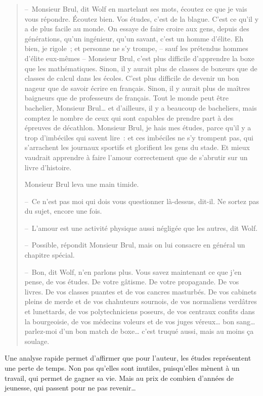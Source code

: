 {\small
\begin{quotation}
– Monsieur Brul, dit Wolf en martelant ses mots, écoutez ce que je vais vous répondre.
Écoutez bien. Vos études, c’est de la blague. C’est ce qu’il y a de plus facile au monde.
On essaye de faire croire aux gens, depuis des générations, qu’un ingénieur, qu’un savant,
c’est un homme d’élite. Eh bien, je rigole ; et personne ne s’y trompe, – sauf les
prétendus hommes d’élite eux-mêmes – Monsieur Brul, c’est plus difficile d’apprendre la
boxe que les mathématiques. Sinon, il y aurait plus de classes de boxeurs que de classes
de calcul dans les écoles. C’est plus difficile de devenir un bon nageur que de savoir
écrire en français. Sinon, il y aurait plus de maîtres baigneurs que de professeurs de
français. Tout le monde peut être bachelier, Monsieur Brul… et d’ailleurs, il y a beaucoup
de bacheliers, mais comptez le nombre de ceux qui sont capables de prendre part à des
épreuves de décathlon. Monsieur Brul, je hais mes études, parce qu’il y a trop
d’imbéciles qui savent lire : et ces imbéciles ne s’y trompent pas, qui s’arrachent
les journaux sportifs et glorifient les gens du stade. Et mieux vaudrait apprendre à
faire l’amour correctement que de s’abrutir sur un livre d’histoire.

Monsieur Brul leva une main timide.

– Ce n’est pas moi qui dois vous questionner là-dessus, dit-il. Ne sortez pas du sujet, encore une fois.

– L’amour est une activité physique aussi négligée que les autres, dit Wolf.

– Possible, répondit Monsieur Brul, mais on lui consacre en général un chapitre spécial.

– Bon, dit Wolf, n’en parlons plus. Vous savez maintenant ce que j’en pense, de vos études.
De votre gâtisme. De votre propagande. De vos livres. De vos classes puantes et de vos cancres
masturbés. De vos cabinets pleins de merde et de vos chahuteurs sournois, de vos normaliens
verdâtres et lunettards, de vos polytechniciens poseurs, de vos centraux confits dans la
bourgeoisie, de vos médecins voleurs et de vos juges véreux… bon sang… parlez-moi d’un bon
match de boxe… c’est truqué aussi, mais au moins ça soulage.
\end{quotation}
}

Une analyse rapide permet d'affirmer que pour l'auteur, les études représentent
une perte de temps. Non pas qu'elles sont inutiles, puisqu'elles mènent à un
travail, qui permet de gagner sa vie. Mais au prix de combien d'années de jeunesse,
qui passent pour ne pas revenir\ldots

